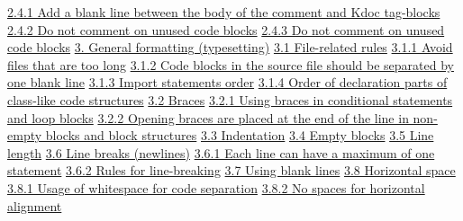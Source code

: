 \hspace{1.0cm}\hyperref[sec:2.4.1]{ 2.4.1 Add a blank line between the body of the comment and Kdoc tag-blocks}
\hspace{1.0cm}\hyperref[sec:2.4.2]{ 2.4.2 Do not comment on unused code blocks}
\hspace{1.0cm}\hyperref[sec:2.4.3]{ 2.4.3 Do not comment on unused code blocks}
\hspace{1.0cm}\hyperref[sec:]{}
\hspace{0.0cm}\hyperref[sec:3.]{3. General formatting (typesetting)}
\hspace{0.5cm}\hyperref[sec:3.1]{ 3.1 File-related rules}
\hspace{1.0cm}\hyperref[sec:3.1.1]{ 3.1.1 Avoid files that are too long}
\hspace{1.0cm}\hyperref[sec:3.1.2]{ 3.1.2 Code blocks in the source file should be separated by one blank line}
\hspace{1.0cm}\hyperref[sec:3.1.3]{ 3.1.3 Import statements order}
\hspace{1.0cm}\hyperref[sec:3.1.4]{ 3.1.4 Order of declaration parts of class-like code structures}
\hspace{0.5cm}\hyperref[sec:3.2]{ 3.2 Braces}
\hspace{1.0cm}\hyperref[sec:3.2.1]{ 3.2.1 Using braces in conditional statements and loop blocks}
\hspace{1.0cm}\hyperref[sec:3.2.2]{ 3.2.2 Opening braces are placed at the end of the line in non-empty blocks and block structures}
\hspace{0.5cm}\hyperref[sec:3.3]{ 3.3 Indentation}
\hspace{0.5cm}\hyperref[sec:3.4]{ 3.4 Empty blocks}
\hspace{0.5cm}\hyperref[sec:3.5]{ 3.5 Line length}
\hspace{0.5cm}\hyperref[sec:3.6]{ 3.6 Line breaks (newlines)}
\hspace{1.0cm}\hyperref[sec:3.6.1]{ 3.6.1 Each line can have a maximum of one statement}
\hspace{1.0cm}\hyperref[sec:3.6.2]{ 3.6.2 Rules for line-breaking}
\hspace{0.5cm}\hyperref[sec:3.7]{ 3.7 Using blank lines}
\hspace{0.5cm}\hyperref[sec:3.8]{ 3.8 Horizontal space}
\hspace{1.0cm}\hyperref[sec:3.8.1]{ 3.8.1 Usage of whitespace for code separation}
\hspace{1.0cm}\hyperref[sec:3.8.2]{ 3.8.2 No spaces for horizontal alignment}
